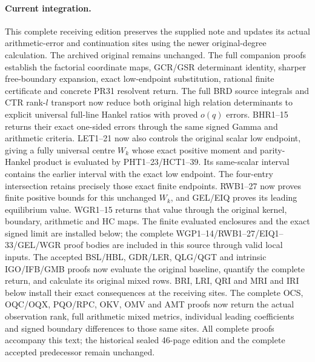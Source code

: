 \documentclass[11pt,a4paper]{article}
\begin{document}
\paragraph{Current integration.}
This complete receiving edition preserves the supplied note and updates
its actual arithmetic-error and continuation sites using the newer
original-degree calculation. The archived original remains unchanged.
The full companion proofs establish the factorial coordinate maps,
GCR/GSR determinant identity, sharper free-boundary expansion,
exact low-endpoint substitution, rational finite certificate and
concrete PR31 resolvent return. The full BRD source integrals
and CTR rank-$l$ transport now reduce both original high relation
determinants to explicit universal full-line Hankel ratios with
proved $o(q)$ errors. BHR1--15 returns their exact one-sided
errors through the same signed Gamma and arithmetic criteria.
LET1--21 now also controls the original scalar low endpoint,
giving a fully universal centre $W_k$ whose exact positive
moment and parity-Hankel product is evaluated by PHT1--23/HCT1--39.
Its same-scalar interval contains the earlier interval with
the exact low endpoint. The four-entry intersection retains precisely
those exact finite endpoints. RWB1--27 now proves finite positive
bounds for this unchanged $W_k$, and GEL/EIQ proves its leading
equilibrium value. WGR1--15 returns that value through the original
kernel, boundary, arithmetic and HC maps. The finite evaluated
enclosures and the exact signed limit are installed below; the
complete WGP1--14/RWB1--27/EIQ1--33/GEL/WGR proof bodies are
included in this source through valid local inputs.
The accepted BSL/HBL, GDR/LER, QLG/QGT and intrinsic IGO/IFB/GMB
proofs now evaluate the original baseline, quantify the complete
return, and calculate its original mixed rows. BRI, LRI, QRI and
MRI and IRI below install their exact consequences at the receiving sites.
The complete OCS, OQC/OQX, PQO/RPC, OKV, OMV and AMT proofs
now return the actual observation rank, full arithmetic mixed
metrics, individual leading coefficients and signed boundary differences
to those same sites.
All complete proofs accompany this text; the historical sealed
46-page edition and the complete accepted predecessor remain unchanged.
\tableofcontents
\end{document}

